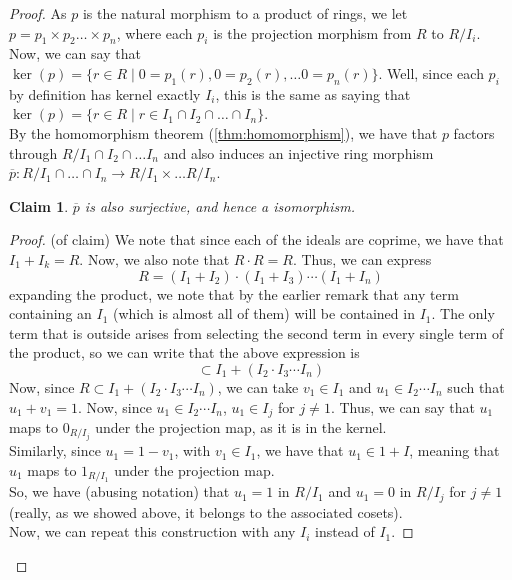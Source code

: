 \documentclass{amsart}
\newtheorem*{claim}{Claim}
\theoremstyle{definition}
\theoremstyle{remark}
\begin{document}
\begin{proof}
    As $p$ is the natural morphism to a product of rings, we let $p = p_1 \times p_2 \dots \times p_n$,
    where each $p_i$ is the projection morphism from $R$ to $R / I_i$. Now, we can say that
    $\ker(p) = \{r \in R \mid 0 = p_1(r), 0 = p_2(r), \dots 0 = p_n(r) \}$. Well, since each $p_i$ by definition has
    kernel exactly $I_i$, this is the same as saying that
    $\ker(p) = \{r \in R \mid r \in I_1 \cap I_2 \cap \dots \cap I_n \}$. \\
    By the homomorphism theorem (\ref{thm:homomorphism}), we have that $p$ factors through
    $R / I_1 \cap I_2 \cap \dots I_n$ and also induces an injective ring morphism
    $\overline{p}: R/ I_1 \cap \dots \cap I_n \rightarrow R/I_1 \times \dots R/I_n$.
    \begin{claim}
        $\overline{p}$ is also surjective, and hence a isomorphism.
    \end{claim}
    \begin{proof} (of claim)
        We note that since each of the ideals are coprime, we have that $I_1 + I_k = R$.
        Now, we also note that $R \cdot R = R$. Thus, we can express
        $$
        R = (I_1  + I_2) \cdot (I_1 + I_3) \cdots (I_1 + I_n)
        $$
        expanding the product, we note that by the earlier remark that any term
        containing an $I_1$ (which is almost all of them) will be contained in
        $I_1$. The only term that is outside arises from selecting the second term
        in every single term of the product, so we can write that the above expression
        is
        $$
        \subset I_1 + (I_2 \cdot I_3 \cdots I_n)
        $$
        Now, since $R \subset I_1 + (I_2 \cdot I_3 \cdots I_n)$, we can take
        $v_1 \in I_1$ and $u_1 \in I_2 \cdots I_n$ such that $u_1 + v_1 = 1$.
        Now, since $u_1 \in I_2 \cdots I_n$, $u_1 \in I_j$ for $j \neq 1$. Thus,
        we can say that $u_1$ maps to $0_{R/I_j}$ under the projection map, as it is
        in the kernel. \\
        Similarly, since $u_1 = 1 - v_1$, with $v_1 \in I_1$, we have that $u_1 \in 1 + I$,
        meaning that $u_1$ maps to $1_{R/I_1}$ under the projection map. \\
        So, we have (abusing notation) that $u_1 = 1$ in $R/I_1$ and $u_1 = 0$ in $R/I_j$ for $j \neq 1$
        (really, as we showed above, it belongs to the associated cosets). \\
        Now, we can repeat this construction with any $I_i$ instead of $I_1$.

\end{proof}
\end{proof}
\end{document}
